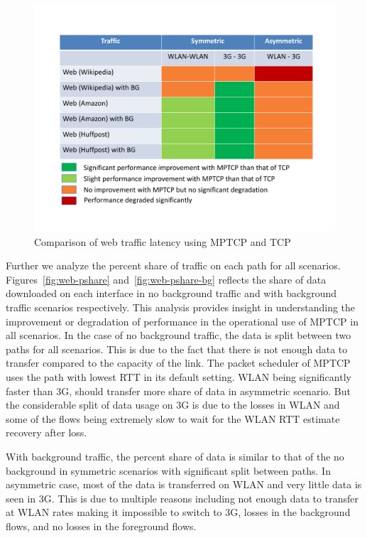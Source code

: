 \begin{figure}[!th]
\begin{minipage}[t]{0.48\textwidth}
\begin{center}
\includegraphics[width=.98\linewidth]{plots/MPTCP-Web}
\end{center}
\caption{Comparison of web traffic latency using MPTCP and TCP}
  \label{fig:web-summary}
\end{minipage}
\end{figure}

Further we analyze the percent share of traffic on each path for all scenarios. Figures~\ref{fig:web-pshare} and~\ref{fig:web-pshare-bg} reflects the 
share of data downloaded on each interface in no background traffic and with background traffic scenarios respectively. This analysis provides insight
in understanding the improvement or degradation of performance in the operational use of MPTCP in all scenarios. In the case of no background traffic,
the data is split between two paths for all scenarios. This is due to the fact that there is not enough data to transfer compared to the capacity of the
link. The packet scheduler of MPTCP uses the path with lowest RTT in its default setting. WLAN being significantly faster than 3G, should transfer more share 
of data in asymmetric scenario. But the considerable split of data usage on 3G is due to the losses in WLAN and some of the flows being extremely
slow to wait for the WLAN RTT estimate recovery after loss.

With background traffic, the percent share of data is similar to that of the no background in symmetric scenarios with significant split between paths.
In asymmetric case, most of the data is transferred on WLAN and very little data is seen in 3G. This is due to multiple reasons including not enough data 
to transfer at WLAN rates making it impossible to switch to 3G, losses in the background flows, and no losses in the foreground flows.

